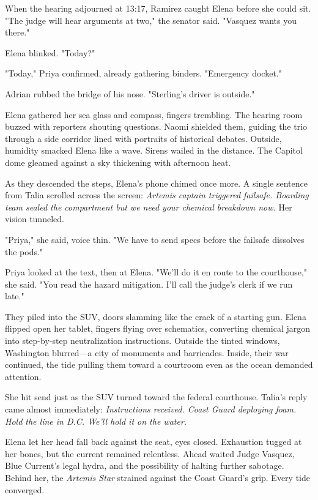 When the hearing adjourned at 13:17, Ramirez caught Elena before she could sit. "The judge will hear arguments at two," the senator said. "Vasquez wants you there."

Elena blinked. "Today?"

"Today," Priya confirmed, already gathering binders. "Emergency docket."

Adrian rubbed the bridge of his nose. "Sterling's driver is outside."

Elena gathered her sea glass and compass, fingers trembling. The hearing room buzzed with reporters shouting questions. Naomi shielded them, guiding the trio through a side corridor lined with portraits of historical debates. Outside, humidity smacked Elena like a wave. Sirens wailed in the distance. The Capitol dome gleamed against a sky thickening with afternoon heat.

As they descended the steps, Elena's phone chimed once more. A single sentence from Talia scrolled across the screen: \textit{Artemis captain triggered failsafe. Boarding team sealed the compartment but we need your chemical breakdown now.} Her vision tunneled.

"Priya," she said, voice thin. "We have to send specs before the failsafe dissolves the pods."

Priya looked at the text, then at Elena. "We'll do it en route to the courthouse," she said. "You read the hazard mitigation. I'll call the judge's clerk if we run late."

They piled into the SUV, doors slamming like the crack of a starting gun. Elena flipped open her tablet, fingers flying over schematics, converting chemical jargon into step-by-step neutralization instructions. Outside the tinted windows, Washington blurred—a city of monuments and barricades. Inside, their war continued, the tide pulling them toward a courtroom even as the ocean demanded attention.

She hit send just as the SUV turned toward the federal courthouse. Talia's reply came almost immediately: \textit{Instructions received. Coast Guard deploying foam. Hold the line in D.C. We'll hold it on the water.}

Elena let her head fall back against the seat, eyes closed. Exhaustion tugged at her bones, but the current remained relentless. Ahead waited Judge Vasquez, Blue Current's legal hydra, and the possibility of halting further sabotage. Behind her, the \textit{Artemis Star} strained against the Coast Guard's grip. Every tide converged.

